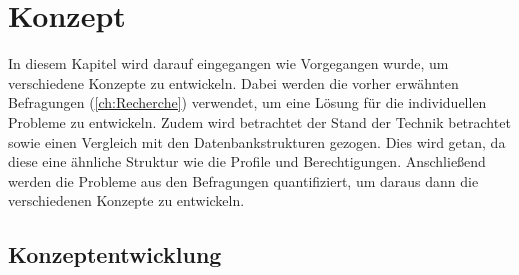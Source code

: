 \chapter{Konzept}
\label{ch:chapter04}
In diesem Kapitel wird darauf eingegangen wie Vorgegangen wurde, um verschiedene Konzepte zu entwickeln.
Dabei werden die vorher erwähnten Befragungen (\ref{ch:Recherche}) verwendet, um eine Lösung für die individuellen Probleme zu entwickeln.
Zudem wird betrachtet der Stand der Technik betrachtet sowie einen Vergleich mit den Datenbankstrukturen gezogen.
Dies wird getan, da diese eine ähnliche Struktur wie die Profile und Berechtigungen.
Anschließend werden die Probleme aus den Befragungen quantifiziert, um daraus dann die verschiedenen Konzepte zu entwickeln.


\section{Konzeptentwicklung}
\label{sec:chapter04:Konzeptentwicklung}

